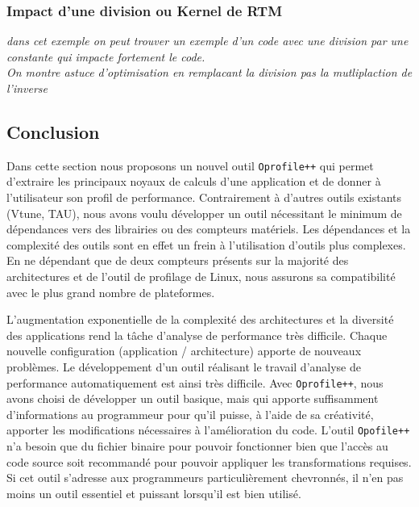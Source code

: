     \subsubsection{Impact d'une division ou Kernel de RTM}
    
    \textit{dans cet exemple on peut trouver un exemple d'un code avec une division par une constante qui impacte fortement le code.}\\
    \textit{On montre astuce d'optimisation en remplacant la division pas la mutliplaction de l'inverse}\\
    







\subsection{Conclusion}

    Dans cette section nous proposons un nouvel outil \verb|Oprofile++| qui permet d'extraire les principaux noyaux de calculs d'une application et de donner à l'utilisateur son profil de performance. Contrairement à d'autres outils existants (Vtune, TAU), nous avons voulu développer un outil nécessitant le minimum de dépendances vers des librairies ou des compteurs matériels. Les dépendances et la complexité des outils sont en effet un frein à l'utilisation d'outils plus complexes. En ne dépendant que de deux compteurs présents sur la majorité des architectures et de l'outil de profilage de Linux, nous assurons sa compatibilité avec le plus grand nombre de plateformes. 

    L'augmentation exponentielle de la complexité des architectures et la diversité des applications rend la tâche d'analyse de performance très difficile. Chaque nouvelle configuration (application / architecture) apporte de nouveaux problèmes. Le développement d'un outil réalisant le travail d'analyse de performance automatiquement est ainsi très difficile. Avec \verb|Oprofile++|, nous avons choisi de développer un outil basique, mais qui apporte suffisamment d'informations au programmeur pour qu'il puisse, à l'aide de sa créativité, apporter les modifications nécessaires à l'amélioration du code. L'outil \verb|Opofile++| n'a besoin que du fichier binaire pour pouvoir fonctionner bien que l'accès au code source soit recommandé pour pouvoir appliquer les transformations requises. Si cet outil s'adresse aux programmeurs particulièrement chevronnés, il n'en pas moins un outil essentiel et puissant lorsqu'il est bien utilisé. 
    

